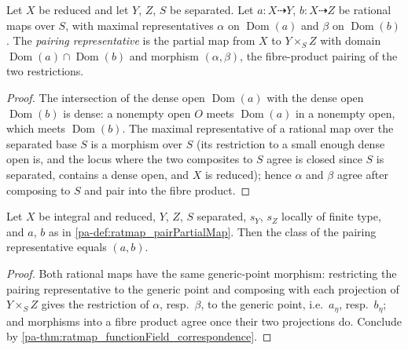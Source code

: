 \begin{definition}
  \label{pa-def:ratmap_pairPartialMap}
  \leanok

  Let \(X\) be reduced and let \(Y\), \(Z\), \(S\) be separated. Let
  \(a : X \dashrightarrow Y\), \(b : X \dashrightarrow Z\) be rational maps over
  \(S\), with maximal representatives \(\alpha\) on \(\operatorname{Dom}(a)\)
  and \(\beta\) on \(\operatorname{Dom}(b)\). The \emph{pairing representative}
  is the partial map from \(X\) to \(Y \times_S Z\) with domain
  \(\operatorname{Dom}(a) \cap \operatorname{Dom}(b)\) and morphism
  \((\alpha, \beta)\), the fibre-product pairing of the two restrictions.
\end{definition}
\begin{proof}
  \leanok
  The intersection of the dense open \(\operatorname{Dom}(a)\) with the dense
  open \(\operatorname{Dom}(b)\) is dense: a nonempty open \(O\) meets
  \(\operatorname{Dom}(a)\) in a nonempty open, which meets
  \(\operatorname{Dom}(b)\). The maximal representative of a rational map over
  the separated base \(S\) is a morphism over \(S\) (its restriction to a small
  enough dense open is, and the locus where the two composites to \(S\) agree is
  closed since \(S\) is separated, contains a dense open, and \(X\) is reduced);
  hence \(\alpha\) and \(\beta\) agree after composing to \(S\) and pair into
  the fibre product.
\end{proof}

\begin{lemma}
  \label{pa-lem:ratmap_pairPartialMap_represents}
  \leanok

  Let \(X\) be integral and reduced, \(Y\), \(Z\), \(S\) separated, \(s_Y\),
  \(s_Z\) locally of finite type, and \(a\), \(b\) as in
  \ref{pa-def:ratmap_pairPartialMap}. Then the class of the pairing representative
  equals \((a, b)\).
\end{lemma}
\begin{proof}
  \leanok
  Both rational maps have the same generic-point morphism: restricting the
  pairing representative to the generic point and composing with each projection
  of \(Y \times_S Z\) gives the restriction of \(\alpha\), resp.\ \(\beta\), to
  the generic point, i.e.\ \(a_\eta\), resp.\ \(b_\eta\); and morphisms into a
  fibre product agree once their two projections do. Conclude by
  \ref{pa-thm:ratmap_functionField_correspondence}.
\end{proof}

